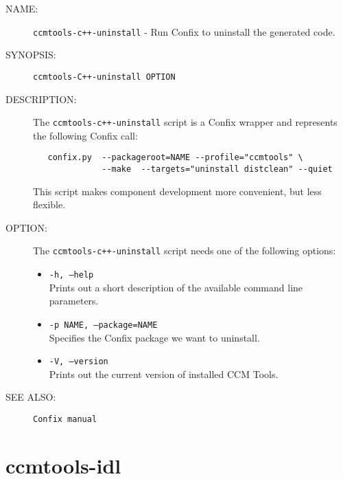 \begin{description}

\item [NAME:] 
  {\tt ccmtools-c++-uninstall} - Run Confix to uninstall the generated code.

\item [SYNOPSIS:] 
  {\tt ccmtools-C++-uninstall OPTION}

\item [DESCRIPTION:]
  The {\tt ccmtools-c++-uninstall} script is a Confix wrapper and
  represents the following Confix call:
  \begin{small}
  \begin{verbatim}
   confix.py  --packageroot=NAME --profile="ccmtools" \
              --make  --targets="uninstall distclean" --quiet
  \end{verbatim}
  \end{small}
  This script makes component development more convenient,
  but less flexible. 

\item [OPTION:]
  The {\tt ccmtools-c++-uninstall} script needs one of the following options:
  \begin{itemize}
  \item {\tt -h, --help} \\
    Prints out a short description of the available command line parameters.

  \item {\tt -p NAME, --package=NAME} \\
    Specifies the Confix package we want to uninstall. 

  \item {\tt -V, --version} \\
    Prints out the current version of installed CCM Tools.
  \end{itemize}
  
\item [SEE ALSO:]
  {\tt Confix manual}
  
\end{description}


\section{ccmtools-idl}

